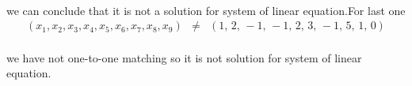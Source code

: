 \documentclass[11pt]{article}
\begin{document}
\paragraph{}we can conclude that it is not a solution for system of linear equation.For last one
\begin{eqnarray}
(x_1,x_2,x_3,x_4,x_5,x_6,x_7,x_8,x_9)&\neq &(1,\,2,\,-1,\,-1,\,2,\,3,\,-1,\,5,\,1,\, 0)
\end{eqnarray}
\paragraph{}we have not one-to-one matching so it is not solution for system of linear equation.
\end{document}
